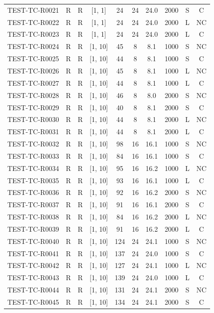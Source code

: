 \begin{longtable}{lccccccccc}
TEST-TC-R0021 & R & R & [1, 1] & 24 & 24 & 24.0 & 2000 & S & C \\
TEST-TC-R0022 & R & R & [1, 1] & 24 & 24 & 24.0 & 2000 & L & NC \\
TEST-TC-R0023 & R & R & [1, 1] & 24 & 24 & 24.0 & 2000 & L & C \\
TEST-TC-R0024 & R & R & [1, 10] & 45 & 8 & 8.1 & 1000 & S & NC \\
TEST-TC-R0025 & R & R & [1, 10] & 44 & 8 & 8.1 & 1000 & S & C \\
TEST-TC-R0026 & R & R & [1, 10] & 45 & 8 & 8.1 & 1000 & L & NC \\
TEST-TC-R0027 & R & R & [1, 10] & 44 & 8 & 8.1 & 1000 & L & C \\
TEST-TC-R0028 & R & R & [1, 10] & 46 & 8 & 8.0 & 2000 & S & NC \\
TEST-TC-R0029 & R & R & [1, 10] & 40 & 8 & 8.1 & 2000 & S & C \\
TEST-TC-R0030 & R & R & [1, 10] & 44 & 8 & 8.1 & 2000 & L & NC \\
TEST-TC-R0031 & R & R & [1, 10] & 44 & 8 & 8.1 & 2000 & L & C \\
TEST-TC-R0032 & R & R & [1, 10] & 98 & 16 & 16.1 & 1000 & S & NC \\
TEST-TC-R0033 & R & R & [1, 10] & 84 & 16 & 16.1 & 1000 & S & C \\
TEST-TC-R0034 & R & R & [1, 10] & 95 & 16 & 16.2 & 1000 & L & NC \\
TEST-TC-R0035 & R & R & [1, 10] & 93 & 16 & 16.1 & 1000 & L & C \\
TEST-TC-R0036 & R & R & [1, 10] & 92 & 16 & 16.2 & 2000 & S & NC \\
TEST-TC-R0037 & R & R & [1, 10] & 91 & 16 & 16.1 & 2000 & S & C \\
TEST-TC-R0038 & R & R & [1, 10] & 84 & 16 & 16.2 & 2000 & L & NC \\
TEST-TC-R0039 & R & R & [1, 10] & 91 & 16 & 16.2 & 2000 & L & C \\
TEST-TC-R0040 & R & R & [1, 10] & 124 & 24 & 24.1 & 1000 & S & NC \\
TEST-TC-R0041 & R & R & [1, 10] & 137 & 24 & 24.0 & 1000 & S & C \\
TEST-TC-R0042 & R & R & [1, 10] & 127 & 24 & 24.1 & 1000 & L & NC \\
TEST-TC-R0043 & R & R & [1, 10] & 139 & 24 & 24.0 & 1000 & L & C \\
TEST-TC-R0044 & R & R & [1, 10] & 131 & 24 & 24.1 & 2000 & S & NC \\
TEST-TC-R0045 & R & R & [1, 10] & 134 & 24 & 24.1 & 2000 & S & C \\

\end{longtable}
